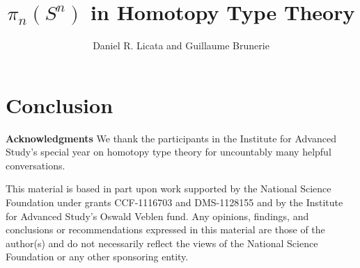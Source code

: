 \documentclass{drl-common/llncs}
\begin{document}
\title{$\pi_n(S^n)$ in Homotopy Type Theory}


\author{Daniel R. Licata
        and Guillaume Brunerie}


\maketitle





\section{Conclusion}

\textbf{Acknowledgments} We thank the participants in the 
Institute for Advanced Study's special year on homotopy type theory
for uncountably many helpful conversations.  

This material is based in part upon work supported by the National
Science Foundation under grants CCF-1116703 and DMS-1128155 and by the
Institute for Advanced Study's Oswald Veblen fund.  Any opinions,
findings, and conclusions or recommendations expressed in this material
are those of the author(s) and do not necessarily reflect the views of
the National Science Foundation or any other sponsoring entity.

{ \small


}
\end{document}
